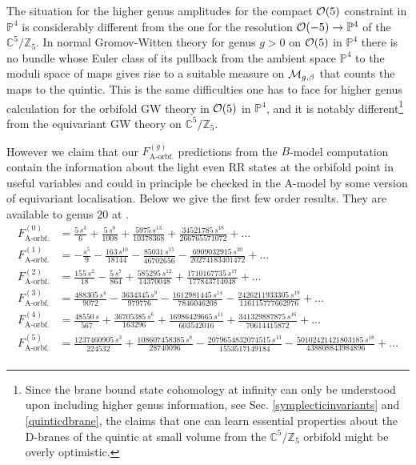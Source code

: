 \documentclass[12pt]{article}
\begin{document}
The situation for the higher genus amplitudes  for the compact
${\cal O}(5)$ constraint in $\mathbb{P}^4$ is considerably
different from the one for the resolution ${\cal O}(-5)\rightarrow
\mathbb{P}^4$ of the $\mathbb{C}^5/\mathbb{Z}_5$. In normal
Gromov-Witten theory for genus $g>0$ on ${\cal O}(5)$ in
$\mathbb{P}^4$ there is no bundle whose Euler class of its pullback
from the ambient space $\mathbb{P}^4$ to the moduli space of
maps gives rise to a suitable measure on ${\cal M}_{g,\beta}$ that
counts the maps to the quintic. This is the same difficulties one
has to face for higher genus calculation for the orbifold GW
theory in ${\cal O}(5)$ in  $\mathbb{P}^4$, and it is notably
different\footnote{Since the brane bound state cohomology at
infinity can only be understood upon including higher genus
information, see Sec. \ref{symplecticinvariants} and
\ref{quinticdbrane}, the claims that one can learn essential
properties about the D-branes of the quintic at small volume from
the $\mathbb{C}^5/\mathbb{Z}_5$ orbifold might be overly
optimistic.} from the equivariant GW theory on
$\mathbb{C}^5/\mathbb{Z}_5$.

However we claim that our $F^{(g)}_{\textrm{A-orbf.}}$ predictions
from the $B$-model computation contain the information about the
light even RR states at the orbifold point in useful variables and
could in principle be checked  in the A-model by some version of
equivariant localisation. Below we give the first few order
results. They are available to genus $20$ at \cite{webpage}.
$$
\begin{array}{rl}
F^{(0)}_{\textrm{A-orbf.}}&=\frac{5\,s^3}{6} + \frac{5\,s^8}{1008} + \frac{5975\,s^{13}}{10378368} +
\frac{34521785\,s^{18}}{266765571072}+\ldots\\ [2 mm]
F^{(1)}_{\textrm{A-orbf.}}&= -\frac{s^5}{9} - \frac{163 \, s^{10}}{18144} - \frac{85031 \, s^{15}}{46702656} -
\frac{6909032915\, s^{20}}{20274183401472} +\ldots \\[2 mm]
F^{(2)}_{\textrm{A-orbf.}}&=\frac{155\,s^2}{18} - \frac{5\,s^7}{864} + \frac{585295\,s^{12}}{14370048} +
\frac{1710167735\,s^{17}}{177843714048}+\ldots\\[2 mm]
F^{(3)}_{\textrm{A-orbf.}}&=\frac{488305\,s^4}{9072} - \frac{3634345\,s^9}{979776} - \frac{1612981445\,s^{14}}{7846046208} -
  \frac{2426211933305\,s^{19}}{116115777662976} +\ldots\\[2 mm]
F^{(4)}_{\textrm{A-orbf.}}&=\frac{48550\,s}{567} + \frac{36705385\,s^6}{163296} + \frac{16986429665\,s^{11}}{603542016} +
  \frac{341329887875\,s^{16}}{70614415872}+\ldots\\[2 mm]
F^{(5)}_{\textrm{A-orbf.}}&=\frac{1237460905\,s^3}{224532} + \frac{108607458385\,s^8}{28740096} - \frac{2079654832074515\,s^{13}}{1553517149184} -
  \frac{50102421421803185\,s^{18}}{438808843984896}+\ldots\\ [2 mm]
\end{array}
$$
\end{document}
